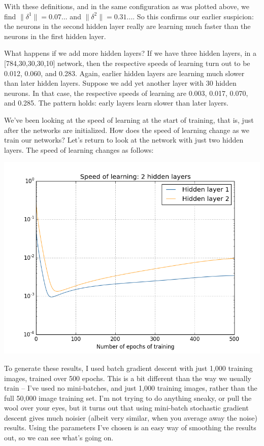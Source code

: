 \documentclass[a4paper,twoside,10pt]{book}
\begin{document}
With these definitions, and in the same configuration as was plotted above, we find $\|\delta^1\| = 0.07...$ and $\|\delta^2\|=0.31...$. So this confirms our earlier suspicion: the neurons in the second hidden layer really are learning much faster than the neurons in the first hidden layer.

What happens if we add more hidden layers? If we have three hidden layers, in a [784,30,30,30,10] network, then the respective speeds of learning turn out to be 0.012, 0.060, and 0.283. Again, earlier hidden layers are learning much slower than later hidden layers. Suppose we add yet another layer with 30 hidden neurons. In that case, the respective speeds of learning are 0.003, 0.017, 0.070, and 0.285. The pattern holds: early layers learn slower than later layers.

We've been looking at the speed of learning at the start of training, that is, just after the networks are initialized. How does the speed of learning change as we train our networks? Let's return to look at the network with just two hidden layers. The speed of learning changes as follows:
\begin{center}
	\includegraphics[width=0.7\linewidth]{figures/ch5/training_speed_2_layers}
\end{center}
To generate these results, I used batch gradient descent with just 1,000 training images, trained over 500 epochs. This is a bit different than the way we usually train -- I've used no mini-batches, and just 1,000 training images, rather than the full 50,000 image training set. I'm not trying to do anything sneaky, or pull the wool over your eyes, but it turns out that using mini-batch stochastic gradient descent gives much noisier (albeit very similar, when you average away the noise) results. Using the parameters I've chosen is an easy way of smoothing the results out, so we can see what's going on.
\end{document}
